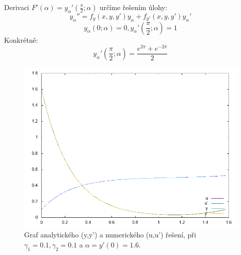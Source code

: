\documentclass[11pt, a4paper]{article}
\begin{document}
Derivaci \(F'(\alpha) = y_{\alpha}'(\frac{\pi}{2};\alpha)\) určíme řešením úlohy:
\[y_\alpha'' = f_y(x,y,y') y_\alpha + f_{y'}(x,y,y') y_\alpha'\]
\[y_\alpha(0;\alpha)=0, y_\alpha'(\frac{\pi}{2};\alpha) = 1\]
Konkrétně:
\[y_\alpha'(\frac{\pi}{2};\alpha) = \frac{e^{2\pi}+e^{-2\pi}}{2}\]


\begin{figure}
  \includegraphics[width=\columnwidth]{img/numeric.png}
  \caption{Graf analytického (y,y') a numerického (u,u') řešení, při \(\gamma_1 = 0.1, \gamma_2 = 0.1\) a \(\alpha = y'(0) = 1.6\). }
  \label{fig:numeric}
\end{figure}
\end{document}
